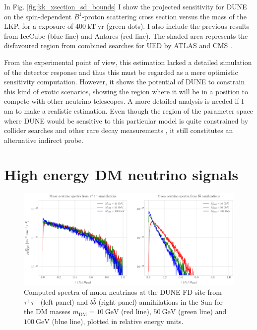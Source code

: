 In Fig. \ref{fig:kk_xsection_sd_bounds} I show the projected sensitivity for DUNE on the spin-dependent $B^{1}$-proton scattering cross section versus the mass of the LKP, for a exposure of $400 \ \mathrm{kT}  \ \mathrm{yr}$ (green dots). I also include the previous results from IceCube \cite{Bernadich2019} (blue line) and Antares \cite{Zornoza2012} (red line). The shaded area represents the disfavoured region from combined searches for UED by ATLAS and CMS \cite{Deutschmann2017}.

From the experimental point of view, this estimation lacked a detailed simulation of the detector response and thus this must be regarded as a mere optimistic sensitivity computation. However, it shows the potential of DUNE to constrain this kind of exotic scenarios, showing the region where it will be in a position to compete with other neutrino telescopes. A more detailed analysis is needed if I am to make a realistic estimation. Even though the region of the parameter space where DUNE would be sensitive to this particular model is quite constrained by collider searches \cite{Deutschmann2017} and other rare decay measurements \cite{Haisch2007, Freitas2008}, it still constitutes an alternative indirect probe.

\section{High energy DM neutrino signals}
\label{sec:dm_analysis_high_e_nu}

\begin{figure}[t]
	\centering
	\includegraphics[width=1\linewidth]{Images/DM_Analysis/solardm_nu_mu_spectra.pdf}
	\caption[Computed spectra of muon neutrinos at the DUNE FD site from $\tau^{+} \tau^{-}$ and $b\bar{b}$ annihilations in the Sun for different DM masses.]{Computed spectra of muon neutrinos at the DUNE FD site from $\tau^{+} \tau^{-}$ (left panel) and $b\bar{b}$ (right panel) annihilations in the Sun for the DM masses $m_{\mathrm{DM}} = 10 \ \mathrm{GeV}$ (red line), $50 \ \mathrm{GeV}$ (green line) and $100 \ \mathrm{GeV}$ (blue line), plotted in relative energy units.}
	\label{fig:solardm_nu_mu_spectra}
\end{figure}


